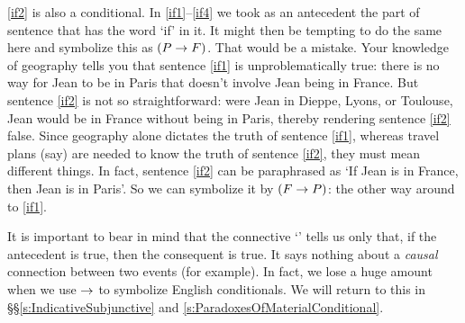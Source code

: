 \ref{if2} is also a conditional. In \ref{if1}--\ref{if4} we took as an antecedent the part of sentence that has the word `if' in it. It might then be tempting to do the same here and symbolize this as $(P\rightarrow F)$. That would be a mistake. Your knowledge of geography tells you that sentence \ref{if1} is unproblematically true: there is no way for Jean to be in Paris that doesn't involve Jean being in France. But sentence \ref{if2} is not so straightforward: were  Jean in Dieppe, Lyons, or Toulouse, Jean would be in France without being in Paris, thereby rendering sentence \ref{if2} false. Since geography alone dictates the truth of sentence \ref{if1}, whereas travel plans (say) are needed to know the truth of sentence \ref{if2}, they must mean different things.
In fact, sentence \ref{if2} can be paraphrased as `If Jean is in France, then Jean is in Paris'. So we can symbolize it by $(F \rightarrow P)$: the other way around to \ref{if1}. 

\noindent It is important to bear in mind that the connective `\eif' tells us only that, if the antecedent is true, then the consequent is true. It says nothing about a \emph{causal} connection between two events (for example). In fact, we lose a huge amount when we use $\rightarrow$ to symbolize English conditionals. We will return to this in \S\S\ref{s:IndicativeSubjunctive} and \ref{s:ParadoxesOfMaterialConditional}.

%


